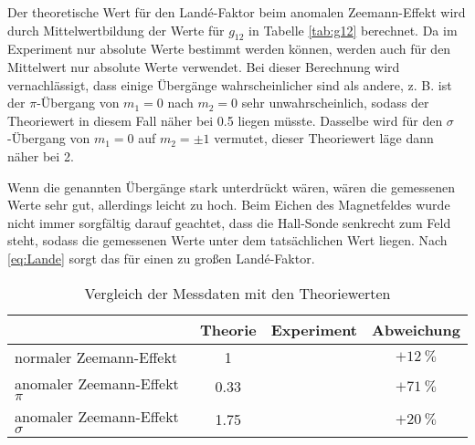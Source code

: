 Der theoretische Wert für den Landé-Faktor beim anomalen Zeemann-Effekt wird durch Mittelwertbildung der Werte für $g_{12}$ in Tabelle \ref{tab:g12} berechnet. Da im Experiment nur absolute Werte bestimmt werden können, werden auch für den Mittelwert nur absolute Werte verwendet. Bei dieser Berechnung wird vernachlässigt, dass einige Übergänge wahrscheinlicher sind als andere, z. B. ist der $\pi$-Übergang von $m_1=0$ nach $m_2=0$ sehr unwahrscheinlich, sodass der Theoriewert in diesem Fall näher bei 0.5 liegen müsste. Dasselbe wird für den $\sigma$-Übergang von $m_1=0$ auf $m_2=\pm1$ vermutet, dieser Theoriewert läge dann näher bei 2.


Wenn die genannten Übergänge stark unterdrückt wären, wären die gemessenen Werte sehr gut, allerdings leicht zu hoch. Beim Eichen des Magnetfeldes wurde nicht immer sorgfältig darauf geachtet, dass die Hall-Sonde senkrecht zum Feld steht, sodass die gemessenen Werte unter dem tatsächlichen Wert liegen. Nach \eqref{eq:Lande} sorgt das für einen zu großen Landé-Faktor.
\begin{table}
	\centering
	\begin{tabular}{l|ccc}
		\toprule
		& Theorie & Experiment & Abweichung \\
		\midrule
		normaler Zeemann-Effekt & 1 &  & $+\SI{12}{\%}$ \\
		anomaler Zeemann-Effekt $\pi$ & 0.33 &  & $+\SI{71}{\%}$ \\
		anomaler Zeemann-Effekt $\sigma$ & 1.75 &  & $+\SI{20}{\%}$ \\
		\bottomrule
	\end{tabular}
\caption{Vergleich der Messdaten mit den Theoriewerten}
\label{tab:Vergleich}
\end{table}